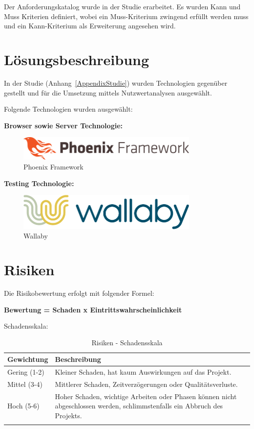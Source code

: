 Der Anforderungskatalog wurde in der Studie erarbeitet. Es wurden Kann und Muss
Kriterien definiert, wobei ein Muss-Kriterium zwingend erfüllt werden muss und
ein Kann-Kriterium als Erweiterung angesehen wird.



\clearpage
\section{Lösungsbeschreibung}\label{loesungsbeschreibung}

In der Studie (Anhang~\ref{AppendixStudie}) wurden Technologien gegenüber
gestellt und für die Umsetzung mittels Nutzwertanalysen ausgewählt.

Folgende Technologien wurden ausgewählt:

\textbf{Browser sowie Server Technologie:}

\begin{figure}[!htb]
  \centering
  \includegraphics[width=0.8\textwidth]{figures/phoenix.png}
  \caption{Phoenix Framework}
\end{figure}

\textbf{Testing Technologie:}

\begin{figure}[!htb]
  \centering
  \includegraphics[width=0.8\textwidth]{figures/wallaby.png}
  \caption{Wallaby}
\end{figure}

\clearpage
\section{Risiken}\label{risiken}

Die Risikobewertung erfolgt mit folgender Formel:

\textbf{Bewertung = Schaden x Eintrittswahrscheinlichkeit}

Schadensskala:

\begin{longtable}[]{@{}lp{10cm}@{}}
  \toprule
  \textbf{Gewichtung} & \textbf{Beschreibung}\tabularnewline
  \midrule
  \endhead
  Gering (1-2) & Kleiner Schaden, hat kaum Auswirkungen auf das Projekt.\tabularnewline
  Mittel (3-4) & Mittlerer Schaden, Zeitverzögerungen oder Qualitätsverluste.\tabularnewline
  Hoch (5-6) & Hoher Schaden, wichtige Arbeiten oder Phasen können nicht abgeschlossen werden, schlimmstenfalls ein Abbruch des Projekts.\tabularnewline
  \bottomrule
  \caption{Risiken - Schadensskala}
\end{longtable}

